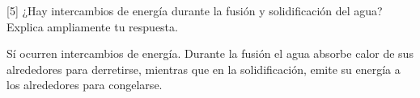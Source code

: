 [5] ¿Hay intercambios de energía durante la fusión y solidificación del agua? Explica ampliamente tu respuesta.

\begin{solutionorlines}
    Sí ocurren intercambios de energía. Durante la fusión el agua absorbe calor de sus alrededores para derretirse, mientras que en la solidificación, emite su energía a los alrededores para congelarse.
\end{solutionorlines}
